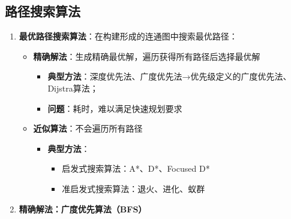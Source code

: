 \documentclass[../main.tex]{subfiles}
\begin{document}
\subsection{路径搜索算法}\label{subsec:path_search}
\begin{enumerate}
    \item \textbf{最优路径搜索算法}：在构建形成的连通图中搜索最优路径：
        \begin{itemize}
            \item \textbf{精确解法}：生成精确最优解，遍历获得所有路径后选择最优解
                \begin{itemize}
                    \item \textbf{典型方法}：深度优先法、广度优先法→优先级定义的广度优先法、Dijstra算法；
                    \item \textbf{问题}：耗时，难以满足快速规划要求
                \end{itemize}
            \item \textbf{近似算法}：不会遍历所有路径
                \begin{itemize}
                    \item \textbf{典型方法}：
                        \begin{itemize}
                            \item 启发式搜索算法：A*、D*、Focused D*
                            \item 准启发式搜索算法：退火、进化、蚁群
                        \end{itemize}
                \end{itemize}
        \end{itemize}

    \item \textbf{精确解法：广度优先算法（BFS）}\label{subsubsec:BFS}
    

\end{enumerate}
\end{document}
